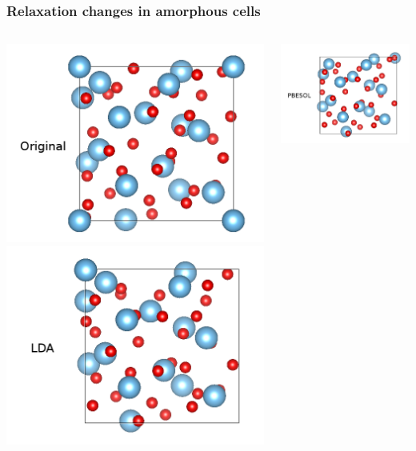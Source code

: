 \documentclass{beamer}
\begin{document}
\begin{frame}
    \frametitle{Relaxation changes in amorphous cells}
	\begin{columns}
	\begin{column}{0.5\linewidth}
		\includegraphics[width=0.9\linewidth]{figures/original.png}
		\newline
		\includegraphics[width=0.9\linewidth]{figures/LDA.png}
	\end{column}
	\begin{column}{0.5\linewidth}
		\includegraphics[width=0.9\linewidth]{figures/PBE.png}

\end{column}
\end{columns}
\end{frame}
\end{document}
